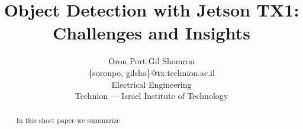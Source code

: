 \documentclass{sig-alternate}
\title{Object Detection with Jetson TX1:\\Challenges and Insights}
\author{
  {
  Oron Port\hspace{10 mm}
  Gil Shomron}\\[0mm]
  \{soronpo, gilsho\}@tx.technion.ac.il\\[0mm]
  Electrical Engineering\\[0mm]
  Technion --- Israel Institute of Technology
}
\begin{document}
\maketitle
\thispagestyle{firstpage}
\pagestyle{plain}




\begin{abstract}

In this short paper we summarize 

\end{abstract}














\end{document}
